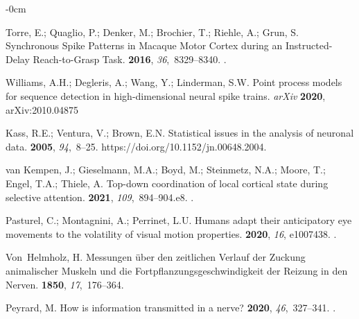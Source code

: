 \documentclass[brainsci, %
               review,accept,pdftex,moreauthors
               ]{Definitions/mdpi}
\begin{document}
\begin{adjustwidth}{-\extralength}{0cm}
\begin{thebibliography}{999}
Torre, E.; Quaglio, P.; Denker, M.; Brochier, T.; Riehle, A.; Grun, S.
\newblock Synchronous {Spike} {Patterns} in {Macaque} {Motor} {Cortex} during
  an {Instructed}-{Delay} {Reach}-to-{Grasp} {Task}.
 {\bf 2016}, {\em 36},~8329--8340.
.

Williams, A.H.; Degleris, A.; Wang, Y.; Linderman, S.W.
\newblock Point process models for sequence detection in high-dimensional
  neural spike trains. \emph{arXiv}  \textbf{2020},  	arXiv:2010.04875

Kass, R.E.; Ventura, V.; Brown, E.N.
\newblock Statistical issues in the analysis of neuronal data.
 {\bf 2005}, {\em 94},~8--25.
  {{https://doi.org/10.1152/jn.00648.2004}}.

van Kempen, J.; Gieselmann, M.A.; Boyd, M.; Steinmetz, N.A.; Moore, T.; Engel,
  T.A.; Thiele, A.
\newblock Top-down coordination of local cortical state during selective
  attention.
 {\bf 2021}, {\em 109},~894--904.e8.
.

Pasturel, C.; Montagnini, A.; Perrinet, L.U.
\newblock Humans adapt their anticipatory eye movements to the volatility of
  visual motion properties.
 {\bf 2020}, \emph{16}, e1007438.
.

Von~Helmholz, H.
\newblock Messungen über den zeitlichen {Verlauf} der {Zuckung} animalischer
  {Muskeln} und die {Fortpflanzungsgeschwindigkeit} der {Reizung} in den
  {Nerven}.
  {\bf 1850}, {\em 17},~176--364.

Peyrard, M.
\newblock How is information transmitted in a nerve?
 {\bf 2020}, {\em 46},~327--341.
.


\end{thebibliography}
\end{adjustwidth}
\end{document}
